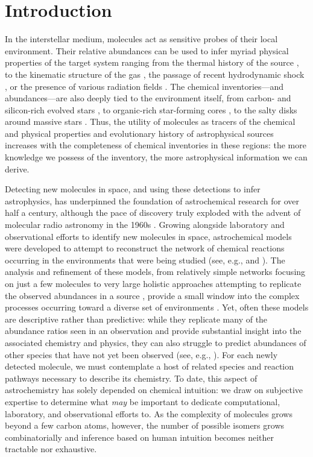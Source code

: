 \documentclass[twocolumn]{aastex63}
\begin{document}
\section{Introduction}
\label{intro}

In the interstellar medium, molecules act as sensitive probes of their local environment. Their relative abundances can be used to infer myriad physical properties of the target system ranging from the thermal history of the source \citep{2002ApJ...571L..55L}, to the kinematic structure of the gas \citep{2018ApJ...860L..13P,2020arXiv200904345D}, the passage of recent hydrodynamic shock \citep{Schilke:1997dt}, or the presence of various radiation fields \citep{2017ApJ...843L...3C}.  The chemical inventories---and abundances---are also deeply tied to the environment itself, from carbon- and silicon-rich evolved stars \citep{Gong:2015ks}, to organic-rich star-forming cores \citep{Belloche:2019hc}, to the salty disks around massive stars \citep{Ginsburg:2019fu}. Thus, the utility of molecules as tracers of the chemical and physical properties and evolutionary history of astrophysical sources increases with the completeness of chemical inventories in these regions: the more knowledge we possess of the inventory, the more astrophysical information we can derive.  

Detecting new molecules in space, and using these detections to infer astrophysics, has underpinned the foundation of astrochemical research for over half a century, although the pace of discovery truly exploded with the advent of molecular radio astronomy in the 1960s \citep{McGuire:2018mc}.  Growing alongside laboratory and observational efforts to identify new molecules in space, astrochemical models were developed to attempt to reconstruct the network of chemical reactions occurring in the environments that were being studied (see, e.g., \citealt{wakelam_2014_2015} and \citealt{Garrod:2008tk}).  The analysis and refinement of these models, from relatively simple networks focusing on just a few molecules \citep{herbst_formation_1973,Guzman:2015iv} to very large holistic approaches attempting to replicate the observed abundances in a source \citep{van_dishoeck_comprehensive_1986,Garrod:2013id}, provide a small window into the complex processes occurring toward a diverse set of environments \citep{Schilke:1997dt}.  Yet, often these models are descriptive rather than predictive: while they replicate many of the abundance ratios seen in an observation and provide substantial insight into the associated chemistry and physics, they can also struggle to predict abundances of other species that have not yet been observed (see, e.g., \citealt{McGuire:2015bp}). For each newly detected molecule, we must contemplate a host of related species and reaction pathways necessary to describe its chemistry. To date, this aspect of astrochemistry has solely depended on chemical intuition: we draw on subjective expertise to determine what \emph{may} be important to dedicate computational, laboratory, and observational efforts to. As the complexity of molecules grows beyond a few carbon atoms, however, the number of possible isomers grows combinatorially and inference based on human intuition becomes neither tractable nor exhaustive. 
\end{document}

